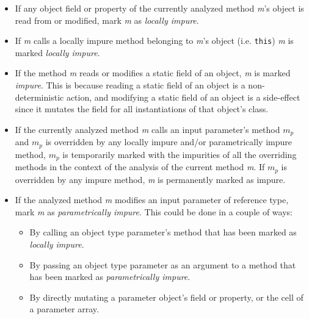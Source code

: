 \documentclass[a4paper,12pt]{article}
\begin{document}
\begin{itemize}
  \item If any object field or property of the currently analyzed method \textit{m}'s object is read from or modified, mark \textit{m} as \textit{locally impure}.
  \item If \textit{m} calls a locally impure method belonging to \textit{m}'s object (i.e. \texttt{this}) \textit{m} is marked \textit{locally impure}.
  \item If the method \textit{m} reads or modifies a static field of an object, \textit{m} is marked \textit{impure}. This is because reading a static field of an object is a non-deterministic action, and modifying a static field of an object is a side-effect since it mutates the field for all instantiations of that object's class.
  \item If the currently analyzed method \textit{m} calls an input parameter's method $m_p$ and $m_p$ is overridden by any locally impure and/or parametrically impure method, $m_p$ is temporarily marked with the impurities of all the overriding methods in the context of the analysis of the current method \textit{m}. If $m_p$ is overridden by any impure method, \textit{m} is permanently marked as impure.
  \item If the analyzed method \textit{m} modifies an input parameter of reference type, mark \textit{m} as \textit{parametrically impure}. This could be done in a couple of ways:
    \begin{itemize}
      \item By calling an object type parameter's method that has been marked as \textit{locally impure}.
      \item By passing an object type parameter as an argument to a method that has been marked as \textit{parametrically impure}.
      \item By directly mutating a parameter object's field or property, or the cell of a parameter array.

\end{itemize}
\end{itemize}
\end{document}
